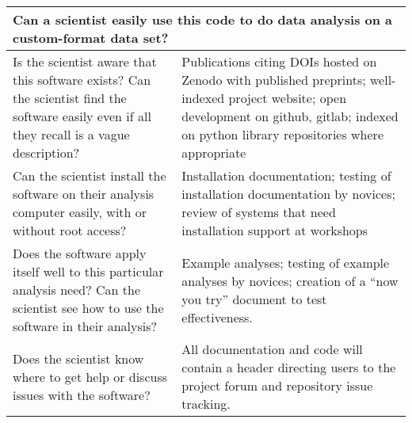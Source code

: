 \begin{tabularx}{\textwidth}{XX}
\multicolumn{2}{l}{Can a scientist easily use this code to do data analysis on a custom-format data set?}\\
    \toprule

    Is the scientist aware that this software exists?  Can the scientist find the software easily even if all they recall is a vague description?
    & Publications citing DOIs hosted on Zenodo with published preprints; well-indexed project website; open development on github, gitlab; indexed on python library repositories where appropriate \\
    Can the scientist install the software on their analysis computer easily, with or without root access?
    & Installation documentation; testing of installation documentation by novices; review of systems that need installation support at workshops \\
    Does the software apply itself well to this particular analysis need?  Can the scientist see how to use the software in their analysis?
    & Example analyses; testing of example analyses by novices; creation of a ``now you try'' document to test effectiveness. \\
    Does the scientist know where to get help or discuss issues with the software?
    & All documentation and code will contain a header directing users to the project forum and repository issue tracking. \\

\bottomrule
\end{tabularx}

